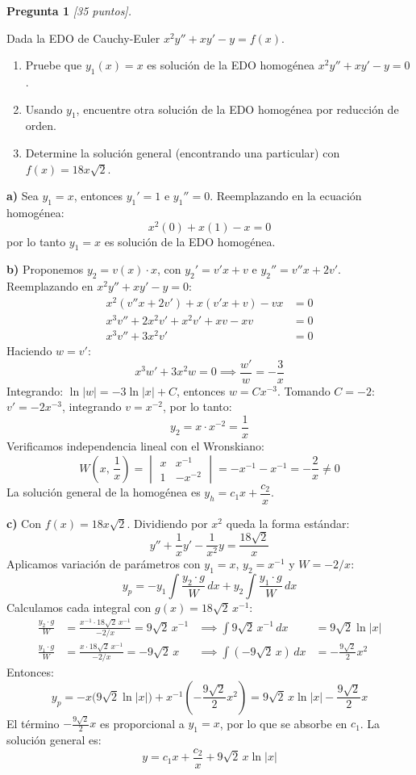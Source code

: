 \documentclass[12pt,letterpaper]{article}
\begin{document}
\textbf{Pregunta 1} \textit{[35 puntos].}

Dada la EDO de Cauchy-Euler $x^2y''+xy'-y=f(x)$.

\begin{enumerate}[label=\alph*)]
  \item Pruebe que $y_1(x)=x$ es solución de la EDO homogénea $x^2y''+xy'-y=0$.
  \item Usando $y_1$, encuentre otra solución de la EDO homogénea por reducción de orden.
  \item Determine la solución general (encontrando una particular) con $f(x)=18x\sqrt{2}$.
\end{enumerate}

\medskip

\textbf{a)} Sea $y_1=x$, entonces $y_1'=1$ e $y_1''=0$. Reemplazando en la ecuación homogénea:
\[
  x^2(0)+x(1)-x = 0
\]
por lo tanto $y_1=x$ es solución de la EDO homogénea.

\medskip

\textbf{b)} Proponemos $y_2=v(x)\cdot x$, con $y_2'=v'x+v$ e $y_2''=v''x+2v'$.
Reemplazando en $x^2y''+xy'-y=0$:
\begin{align*}
  x^2(v''x+2v')+x(v'x+v)-vx &= 0 \\
  x^3v''+2x^2v'+x^2v'+xv-xv &= 0 \\
  x^3v''+3x^2v' &= 0
\end{align*}
Haciendo $w=v'$:
\[
  x^3w'+3x^2w=0 \implies \frac{w'}{w}=-\frac{3}{x}
\]
Integrando: $\ln|w|=-3\ln|x|+C$, entonces $w=Cx^{-3}$. Tomando $C=-2$: $v'=-2x^{-3}$, integrando $v=x^{-2}$, por lo tanto:
\[
  y_2 = x\cdot x^{-2} = \frac{1}{x}
\]
Verificamos independencia lineal con el Wronskiano:
\[
  W\!\left(x,\,\frac{1}{x}\right)
  = \begin{vmatrix} x & x^{-1} \\ 1 & -x^{-2} \end{vmatrix}
  = -x^{-1}-x^{-1} = -\frac{2}{x} \neq 0
\]
La solución general de la homogénea es $y_h = c_1 x + \dfrac{c_2}{x}$.

\medskip

\textbf{c)} Con $f(x)=18x\sqrt{2}$. Dividiendo por $x^2$ queda la forma estándar:
\[
  y''+\frac{1}{x}y'-\frac{1}{x^2}y=\frac{18\sqrt{2}}{x}
\]
Aplicamos variación de parámetros con $y_1=x$, $y_2=x^{-1}$ y $W=-2/x$:
\[
  y_p = -y_1\int\frac{y_2\cdot g}{W}\,dx + y_2\int\frac{y_1\cdot g}{W}\,dx
\]
Calculamos cada integral con $g(x)=18\sqrt{2}\,x^{-1}$:
\begin{align*}
  \frac{y_2\cdot g}{W} &= \frac{x^{-1}\cdot 18\sqrt{2}\,x^{-1}}{-2/x} = 9\sqrt{2}\,x^{-1}
  &\implies \int 9\sqrt{2}\,x^{-1}\,dx &= 9\sqrt{2}\ln|x| \\[4pt]
  \frac{y_1\cdot g}{W} &= \frac{x\cdot 18\sqrt{2}\,x^{-1}}{-2/x} = -9\sqrt{2}\,x
  &\implies \int(-9\sqrt{2}\,x)\,dx &= -\frac{9\sqrt{2}}{2}x^2
\end{align*}
Entonces:
\[
  y_p = -x\bigl(9\sqrt{2}\ln|x|\bigr) + x^{-1}\!\left(-\frac{9\sqrt{2}}{2}x^2\right)
      = 9\sqrt{2}\,x\ln|x| - \frac{9\sqrt{2}}{2}x
\]
El término $-\tfrac{9\sqrt{2}}{2}x$ es proporcional a $y_1=x$, por lo que se absorbe en $c_1$. La solución general es:
\[
  y = c_1 x + \frac{c_2}{x} + 9\sqrt{2}\,x\ln|x|
\]
\end{document}
